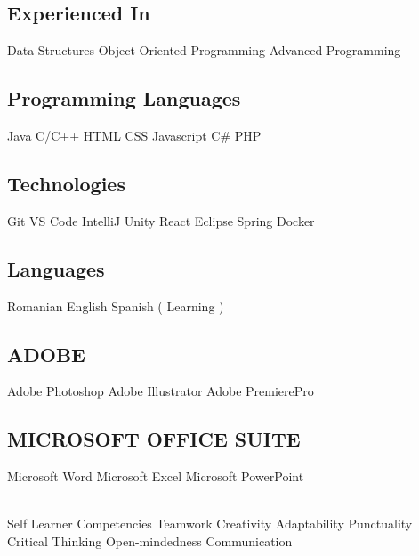 \documentclass[a4paper]{MagicalCV}
\begin{document}
\hfill
\begin{minipage}[t]{0.59\textwidth} 


\subsection{Experienced In}
Data Structures \textbullet{} Object-Oriented Programming \textbullet{} Advanced Programming
\sectionsep

\subsection{Programming Languages}
Java \textbullet{} C/C++ \textbullet{} HTML \textbullet{} CSS \textbullet{} Javascript \textbullet{} C\# \textbullet{} PHP
\sectionsep

\subsection{Technologies}
Git \textbullet{} VS Code \textbullet{} IntelliJ \textbullet{} Unity \textbullet{} React \textbullet{} Eclipse \textbullet{} Spring \textbullet{} Docker
\sectionsep

\subsection{Languages}
Romanian \textbullet{} English \textbullet{} Spanish ( Learning )
\sectionsep

\subsection{ADOBE}
Adobe Photoshop \textbullet{} Adobe Illustrator \textbullet{} Adobe PremierePro
\sectionsep

\subsection{MICROSOFT OFFICE SUITE}
Microsoft Word \textbullet{} Microsoft Excel \textbullet{} Microsoft PowerPoint
\sectionsep

 \\
Self Learner \textbullet{} Competencies \textbullet{} Teamwork \textbullet{} Creativity \textbullet{} Adaptability \textbullet{} Punctuality \textbullet{} Critical Thinking \textbullet{} Open-mindedness \textbullet{} Communication
\sectionsep



\end{minipage}
\end{document}
